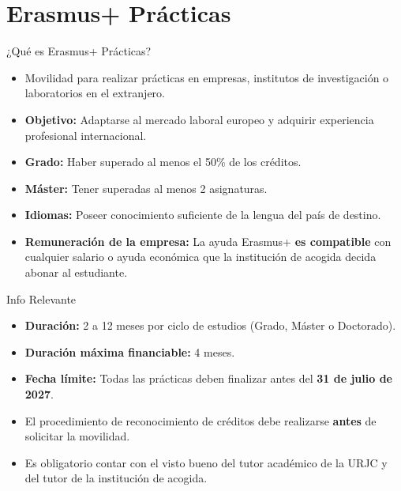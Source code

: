 \section{Erasmus+ Prácticas}

\begin{frame}{¿Qué es Erasmus+ Prácticas?}
    \begin{itemize}
        \item Movilidad para realizar prácticas en empresas, institutos de investigación o laboratorios en el extranjero.
        \item \textbf{Objetivo:} Adaptarse al mercado laboral europeo y adquirir experiencia profesional internacional.
      \item \textbf{Grado:} Haber superado al menos el 50\% de los créditos.
      \item \textbf{Máster:} Tener superadas al menos 2 asignaturas.
      \item \textbf{Idiomas:} Poseer conocimiento suficiente de la lengua del país de destino.
      \item \textbf{Remuneración de la empresa:} La ayuda Erasmus+ \textbf{es compatible} con cualquier salario o ayuda económica que la institución de acogida decida abonar al estudiante.        
    \end{itemize}
\end{frame}

\begin{frame}{Info Relevante}
    \begin{itemize}

      \item \textbf{Duración:} 2 a 12 meses por ciclo de estudios (Grado, Máster o Doctorado).
      \item \textbf{Duración máxima financiable:} 4 meses.
      \item \textbf{Fecha límite:} Todas las prácticas deben finalizar antes del \textbf{31 de julio de 2027}.
        \item El procedimiento de reconocimiento de créditos debe realizarse \textbf{antes} de solicitar la movilidad.
        \item Es obligatorio contar con el visto bueno del tutor académico de la URJC y del tutor de la institución de acogida.
    \end{itemize}
\end{frame}


